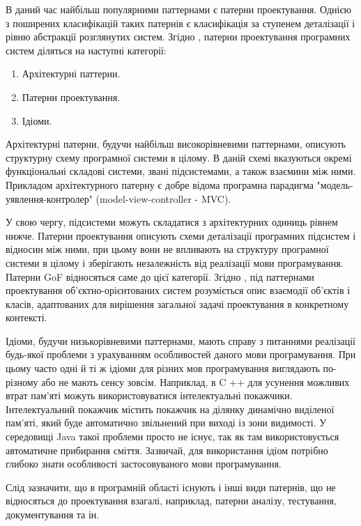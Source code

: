 \documentclass[../main.tex]{subfiles}
\begin{document}
В даний час найбільш популярними паттернами є патерни проектування. Однією з поширених класифікацій таких патернів є класифікація за ступенем деталізації і рівню абстракції розглянутих систем. Згідно \cite{pattern_oriented_arch}, патерни проектування програмних систем діляться на наступні категорії:

\begin{enumerate}
	\item Архітектурні паттерни.
	\item Патерни проектування.
	\item Ідіоми.
\end{enumerate}

Архітектурні патерни, будучи найбільш високорівневими паттернами, описують структурну схему програмної системи в цілому. В даній схемі вказуються окремі функціональні складові системи, звані підсистемами, а також взаємини між ними. Прикладом архітектурного патерну є добре відома програмна парадигма "модель-уявлення-контролер" (model-view-controller - MVC).

У свою чергу, підсистеми можуть складатися з архітектурних одиниць рівнем нижче. Патерни проектування описують схеми деталізації програмних підсистем і відносин між ними, при цьому вони не впливають на структуру програмної системи в цілому і зберігають незалежність від реалізації мови програмування. Патерни GoF відносяться саме до цієї категорії. Згідно \cite{gof}, під паттернами проектування об'єктно-орієнтованих систем розуміється опис взаємодії об'єктів і класів, адаптованих для вирішення загальної задачі проектування в конкретному контексті.

Ідіоми, будучи низькорівневими паттернами, мають справу з питаннями реалізації будь-якої проблеми з урахуванням особливостей даного мови програмування. При цьому часто одні й ті ж ідіоми для різних мов програмування виглядають по-різному або не мають сенсу зовсім. Наприклад, в C ++ для усунення можливих втрат пам'яті можуть використовуватися інтелектуальні покажчики. Інтелектуальний покажчик містить покажчик на ділянку динамічно виділеної пам'яті, який буде автоматично звільнений при виході із зони видимості. У середовищі Java такої проблеми просто не існує, так як там використовується автоматичне прибирання сміття. Зазвичай, для використання ідіом потрібно глибоко знати особливості застосовуваного мови програмування.

Слід зазначити, що в програмній області існують і інші види патернів, що не відносяться до проектування взагалі, наприклад, патерни аналізу, тестування, документування та ін.
\end{document}
